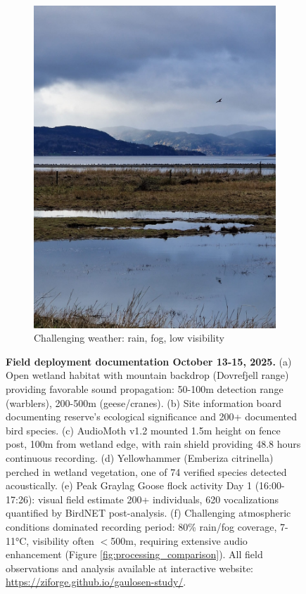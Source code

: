 \documentclass[twocolumn]{article}
\begin{document}
\begin{figure}[h]
\begin{subfigure}{0.31\textwidth}
\includegraphics[width=\textwidth]{07_wetland_waterfowl_dramatic.jpg}
\caption{Challenging weather: rain, fog, low visibility}
\end{subfigure}

\caption{\textbf{Field deployment documentation October 13-15, 2025.} (a) Open wetland habitat with mountain backdrop (Dovrefjell range) providing favorable sound propagation: 50-100m detection range (warblers), 200-500m (geese/cranes). (b) Site information board documenting reserve's ecological significance and 200+ documented bird species. (c) AudioMoth v1.2 mounted 1.5m height on fence post, 100m from wetland edge, with rain shield providing 48.8 hours continuous recording. (d) Yellowhammer (Emberiza citrinella) perched in wetland vegetation, one of 74 verified species detected acoustically. (e) Peak Graylag Goose flock activity Day 1 (16:00-17:26): visual field estimate 200+ individuals, 620 vocalizations quantified by BirdNET post-analysis. (f) Challenging atmospheric conditions dominated recording period: 80\% rain/fog coverage, 7-11°C, visibility often $<$500m, requiring extensive audio enhancement (Figure \ref{fig:processing_comparison}). All field observations and analysis available at interactive website: \url{https://ziforge.github.io/gaulosen-study/}.}
\label{fig:field_deployment}
\end{figure}
\end{document}
